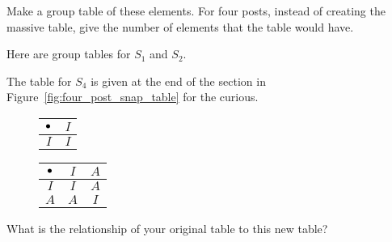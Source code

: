 \documentclass[../key.tex]{subfiles}
\begin{document}
\begin{inner_problem}
\item Make a group table of these elements. For four posts, instead of creating the massive table, give the number of elements that the table would have.
\end{inner_problem}

\noindent Here are group tables for $S_1$ and $S_2$.

The table for $S_4$ is given at the end of the section in Figure~\ref{fig:four_post_snap_table} for the curious.

\begin{figure}[h]
	\begin{center}
		\begin{minipage}[b]{0.45\textwidth}
			\centering
			\begin{tabular}{c|c}
				\hline
				$\bullet$ & $I$ \\ \hline
				\rowcolor{light-gray}
				$I$ & $I$ \\ \hline
			\end{tabular}
			\vspace*{0.5\baselineskip}
		\end{minipage}
		\hfill
		\begin{minipage}[b]{0.45\textwidth}
			\centering
			\begin{tabular}{c|cc}
				\hline
				$\bullet$ & $I$ & $A$ \\ \hline
				\rowcolor{light-gray}
				$I$ & $I$ & $A$ \\
				$A$ & $A$ & $I$ \\ \hline
			\end{tabular}
			\vspace*{0.5\baselineskip}
		\end{minipage}
	\end{center}
	\vspace*{-2\baselineskip}
	\begin{center}
		\begin{minipage}[t]{0.45\textwidth}
		\end{minipage}
		\hfill
		\begin{minipage}[t]{0.45\textwidth}
		\end{minipage}
	\end{center}
	\vspace*{-2\baselineskip}
\end{figure}

\begin{inner_problem}
\item What is the relationship of your original table to this new table?
\end{inner_problem}
\end{document}
